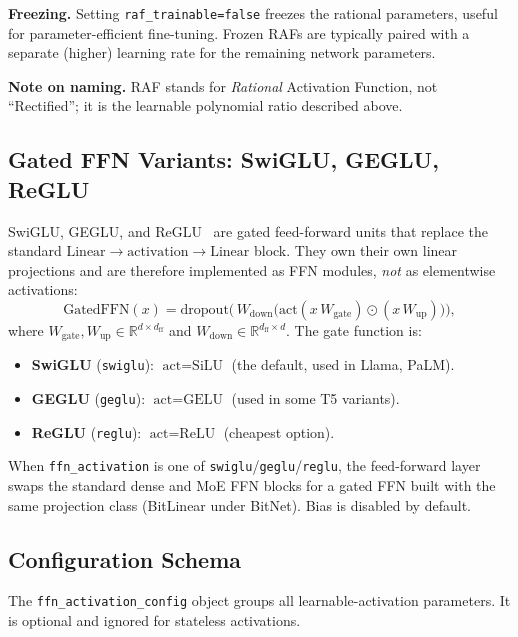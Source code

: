 \textbf{Freezing.} Setting \texttt{raf\_trainable=false} freezes the rational
parameters, useful for parameter-efficient fine-tuning. Frozen RAFs are
typically paired with a separate (higher) learning rate for the remaining
network parameters.

\textbf{Note on naming.} RAF stands for \emph{Rational} Activation Function,
not ``Rectified''; it is the learnable polynomial ratio described above.

\subsection{Gated FFN Variants: SwiGLU, GEGLU, ReGLU}
\label{sec:glu}

SwiGLU, GEGLU, and ReGLU~\citep{shazeer2020glu} are gated feed-forward units
that replace the standard $\text{Linear}\to\text{activation}\to\text{Linear}$
block. They own their own linear projections and are therefore implemented as
FFN modules, \emph{not} as elementwise activations:
\[
  \text{GatedFFN}(x) = \text{dropout}\!\Big(\,
    W_{\text{down}}\Big(\text{act}(x\,W_{\text{gate}})
    \odot (x\,W_{\text{up}})\Big)\Big),
\]
where $W_{\text{gate}}, W_{\text{up}}\in\mathbb{R}^{d\times d_{\text{ff}}}$ and
$W_{\text{down}}\in\mathbb{R}^{d_{\text{ff}}\times d}$. The gate function is:
\begin{itemize}[leftmargin=*]
  \item \textbf{SwiGLU} (\texttt{swiglu}): $\text{act}=\text{SiLU}$
    (the default, used in Llama, PaLM).
  \item \textbf{GEGLU} (\texttt{geglu}): $\text{act}=\text{GELU}$
    (used in some T5 variants).
  \item \textbf{ReGLU} (\texttt{reglu}): $\text{act}=\text{ReLU}$
    (cheapest option).
\end{itemize}

\noindent When \texttt{ffn\_activation} is one of
\texttt{swiglu}/\texttt{geglu}/\texttt{reglu}, the feed-forward layer swaps
the standard dense and MoE FFN blocks for a gated FFN built with the same
projection class (BitLinear under BitNet). Bias is disabled by default.

\subsection{Configuration Schema}

The \texttt{ffn\_activation\_config} object groups all learnable-activation
parameters. It is optional and ignored for stateless activations.

